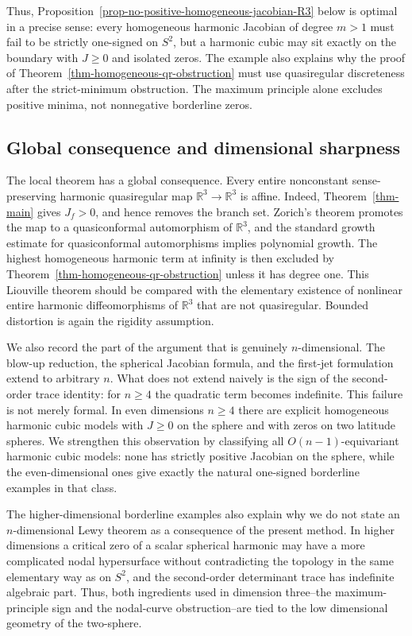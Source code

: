 \documentclass[10pt]{amsart}
\numberwithin{equation}{section}
\theoremstyle{definition}
\newcommand{\R}{\mathbb R}
\begin{document}
Thus, Proposition~\ref{prop-no-positive-homogeneous-jacobian-R3} below is optimal in
a precise sense: every homogeneous harmonic Jacobian of degree \(m>1\) must
fail to be strictly one-signed on \(S^2\), but a harmonic cubic may sit exactly
on the boundary with \(J\ge0\) and isolated zeros. The example also explains
why the proof of Theorem~\ref{thm-homogeneous-qr-obstruction} must use
quasiregular discreteness after the strict-minimum obstruction. The maximum
principle alone excludes positive minima, not nonnegative borderline zeros.


\subsection{Global consequence and dimensional sharpness}

The local theorem has a global consequence. Every entire nonconstant
sense-preserving harmonic quasiregular map \(\R^3\to\R^3\) is affine. Indeed,
Theorem~\ref{thm-main} gives \(J_f>0\), and hence removes the branch set. Zorich's theorem promotes the
map to a quasiconformal automorphism of \(\R^3\), and the standard growth
estimate for quasiconformal automorphisms implies polynomial growth. The
highest homogeneous harmonic term at infinity is then excluded by
Theorem~\ref{thm-homogeneous-qr-obstruction} unless it has degree one. This
Liouville theorem should be compared with the elementary existence of nonlinear
entire harmonic diffeomorphisms of \(\R^3\) that are not quasiregular. Bounded
distortion is again the rigidity assumption.

We also record the part of the argument that is genuinely \(n\)-dimensional.
The blow-up reduction, the spherical Jacobian formula, and the first-jet
formulation extend to arbitrary \(n\). What does not extend naively is the
sign of the second-order trace identity: for \(n\ge4\) the quadratic term
becomes indefinite. This failure is not merely formal. In even dimensions
\(n\ge4\) there are explicit homogeneous harmonic cubic models with
\(J\ge0\) on the sphere and with zeros on two latitude spheres. We strengthen
this observation by classifying all \(O(n-1)\)-equivariant harmonic cubic
models: none has strictly positive Jacobian on the sphere, while the even-dimensional
ones give exactly the natural one-signed borderline examples in that class.

The higher-dimensional borderline examples also explain why we do not state an
\(n\)-dimensional Lewy theorem as a consequence of the present method. In
higher dimensions a critical zero of a scalar spherical harmonic may have a
more complicated nodal hypersurface without contradicting the topology in the
same elementary way as on \(S^2\), and the second-order determinant trace has
indefinite algebraic part. Thus, both ingredients used in dimension three--the
maximum-principle sign and the nodal-curve obstruction--are tied to the low
dimensional geometry of the two-sphere.
\end{document}
